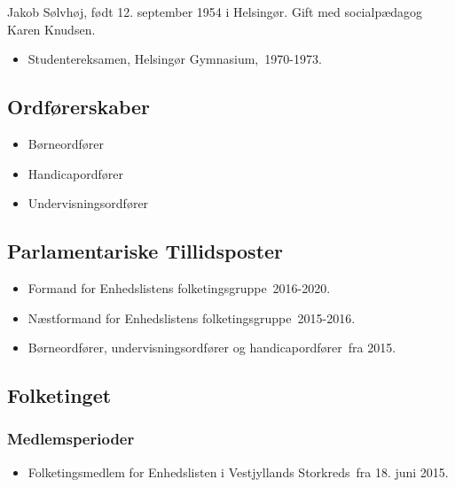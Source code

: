 \documentclass[11pt, a4paper]{awesome-cv}
\begin{document}
\makecvheader[R]
\makelettertitle
\begin{cvletter}
Jakob Sølvhøj, født 12. september 1954 i Helsingør. Gift med socialpædagog Karen Knudsen.

\begin{itemize}
\item Studentereksamen, Helsingør Gymnasium, 1970-1973.
\end{itemize}
\subsection*{Ordførerskaber}
\begin{itemize}
\item Børneordfører
\item Handicapordfører
\item Undervisningsordfører
\end{itemize}
\subsection*{Parlamentariske Tillidsposter}
\begin{itemize}
\item Formand for Enhedslistens folketingsgruppe 2016-2020.
\item Næstformand for Enhedslistens folketingsgruppe 2015-2016.
\item Børneordfører, undervisningsordfører og handicapordfører fra 2015.
\end{itemize}
\subsection*{Folketinget}
\subsubsection*{Medlemsperioder}
\begin{itemize}
\item Folketingsmedlem for Enhedslisten i Vestjyllands Storkreds fra 18. juni 2015.
\end{itemize}

\end{cvletter}
\end{document}
